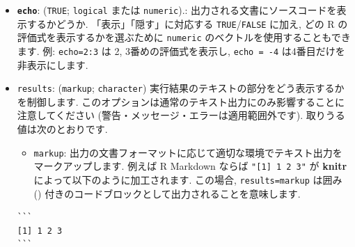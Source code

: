 \documentclass[
  11pt,
]{bxjsreport}
\providecommand{\tightlist}{%
  \setlength{\itemsep}{0pt}\setlength{\parskip}{0pt}}
\begin{document}
\begin{itemize}
\tightlist
\item
  \textbf{\texttt{echo}}: (\texttt{TRUE}; \texttt{logical} または \texttt{numeric}).: 出力される文書にソースコードを表示するかどうか. 「表示」「隠す」に対応する \texttt{TRUE}/\texttt{FALSE} に加え, どの R の評価式を表示するかを選ぶために \texttt{numeric} のベクトルを使用することもできます. 例: \texttt{echo=2:3} は 2, 3番めの評価式を表示し, \texttt{echo = -4} は4番目だけを非表示にします.
\item
  \texttt{results}: (\texttt{\textquotesingle{}markup\textquotesingle{}}; \texttt{character}) 実行結果のテキストの部分をどう表示するかを制御します. このオプションは通常のテキスト出力にのみ影響することに注意してください (警告・メッセージ・エラーは適用範囲外です). 取りうる値は次のとおりです.

  \begin{itemize}
  \tightlist
  \item
    \texttt{markup}: 出力の文書フォーマットに応じて適切な環境でテキスト出力をマークアップします. 例えば R Markdown ならば \texttt{"{[}1{]}\ 1\ 2\ 3"} が \textbf{knitr} によって以下のように加工されます. この場合, \texttt{results=\textquotesingle{}markup\textquotesingle{}} は囲み (\texttt{\textasciigrave{}\textasciigrave{}\textasciigrave{}}) 付きのコードブロックとして出力されることを意味します.
  \end{itemize}

\begin{verbatim}
```
[1] 1 2 3
```
\end{verbatim}


\end{itemize}
\end{document}
